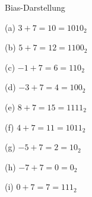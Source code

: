 \begin{exercise}{Bias-Darstellung}
\begin{solution}
\begin{center}
\begin{minipage}{0.3\textwidth}
\begin{parts}
\item[(a)] $3 + 7  = 10 = 1010_2$
\item[(b)] $5 + 7  = 12 = 1100_2$
\item[(c)] $-1 + 7 = 6  = 110_2$
\end{parts}
\end{minipage}
\begin{minipage}{0.3\textwidth}
\begin{parts}
\item[(d)] $-3 + 7 = 4 = 100_2$
\item[(e)] $8 + 7 = 15 = 1111_2$
\item[(f)] $4 + 7 = 11 = 1011_2$
\end{parts}
\end{minipage}
\begin{minipage}{0.3\textwidth}
\begin{parts}
\item[(g)] $-5 + 7 = 2 = 10_2$
\item[(h)] $-7 + 7 = 0 = 0_2$
\item[(i)] $0 + 7 = 7  = 111_2$
\end{parts}
\end{minipage}
\end{center}
\end{solution}
\end{exercise}
